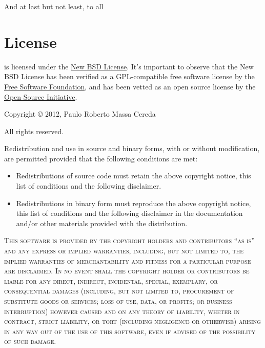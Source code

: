 \documentclass[a4paper,twoside,12pt]{memoir}
\begin{document}
And at last but not least, to all 

\cleardoublepage

\section*{License}

\arara is licensed under the 
\href{http://www.opensource.org/licenses/bsd-license.php}{New BSD License}. 
It's important to observe that the New BSD License has been verified as a 
GPL-compatible free software license by the
\href{http://www.fsf.org/}{Free Software Foundation}, and has been vetted as an 
open source license by the 
\href{http://www.opensource.org/}{Open Source Initiative}.

\vfill

\begin{infobox}[skipabove=\baselineskip plus 2pt minus 1pt]

\vspace{.5em}

\noindent Copyright \copyright{} 2012, Paulo Roberto Massa Cereda

\noindent All rights reserved.

\vspace{1em}

\noindent Redistribution and use in source and binary forms, with or without
modification, are permitted provided that the following conditions are met:

\begin{itemize}
\item Redistributions of source code must retain the above copyright notice, 
      this list of conditions and the following disclaimer.
\item Redistributions in binary form must reproduce the above copyright notice,
      this list of conditions and the following disclaimer in the documentation 
      and/or other materials provided with the distribution.
\end{itemize}

\vspace{1em}

\noindent\textsc{This software is provided by the copyright holders and 
contributors ``as is'' and any express or implied warranties, including, but not 
limited to, the implied warranties of merchantability and fitness for a 
particular purpose are disclaimed. In no event shall the copyright holder or 
contributors be liable for any direct, indirect, incidental, special, exemplary, 
or consequential damages (including, but not limited to, procurement of 
substitute goods or services; loss of use, data, or profits; or business 
interruption) however caused and on any theory of liability, wheter in contract, 
strict liability, or tort (including negligence or otherwise) arising in any way 
out of the use of this software, even if advised of the possibility of such 
damage.}
\end{infobox}
\end{document}
